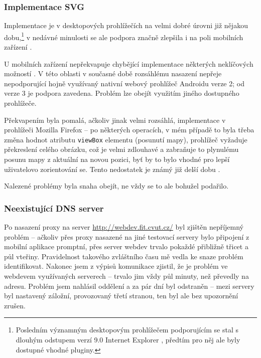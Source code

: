 \subsubsection{Implementace SVG}
Implementace  je v desktopových prohlížečích na velmi dobré úrovni již nějakou dobu,\footnote{Posledním významným desktopovým prohlížečem podporujícím  se stal s dlouhým odstupem verzí 9.0 Internet Explorer \cite{CanIUse}, předtím pro něj ale byly dostupné vhodné pluginy.} v nedávné minulosti se ale podpora značně zlepšila i na poli mobilních zařízení \cite{CanIUse}.

U mobilních zařízení nepřekvapuje chybějící implementace některých neklíčových možností . V této oblasti v současné době rozsáhlému nasazení nepřeje  nepodporující hojně využívaný nativní webový prohlížeč Androidu verze 2; od verze 3 je podpora zavedena. Problém lze obejít využitím jiného dostupného prohlížeče.

Překvapením byla pomalá, ačkoliv jinak velmi rozsáhlá, implementace  v prohlížeči Mozilla Firefox -- po některých operacích, v mém případě to byla třeba změna hodnot atributu \texttt{viewBox}  elementu (posunutí mapy), prohlížeč vyžaduje překreslení celého obrázku, což je velmi zdlouhavé a zabraňuje to plynulému posunu mapy z aktuální na novou pozici, byť by to bylo vhodné pro lepší uživatelovo zorientování se. Tento nedostatek je známý již delší dobu \cite{Bugzilla}.

Nalezené problémy byla snaha obejít, ne vždy se to ale bohužel podařilo.


\subsubsection{Neexistující DNS server}
Po nasazení proxy na server \url{http://webdev.fit.cvut.cz/} byl zjištěn nepříjemný problém -- ačkoliv přes proxy nasazené na jiné testovací servery bylo připojení z mobilní aplikace promptní, přes server webdev trvalo pokaždé přibližně třicet a půl vteřiny. Pravidelnost takového zvláštního času mě vedla ke snaze problém identifikovat. Nakonec jsem z výpisů komunikace zjistil, že je problém ve webdevem využívaných  serverech -- trvalo jim vždy půl minuty, než převedly  na  adresu. Problém jsem nahlásil  oddělení  a za pár dní byl odstraněn -- mezi  servery byl nastavený záložní, provozovaný třetí stranou, ten byl ale bez upozornění zrušen.



